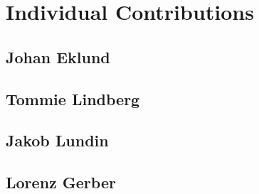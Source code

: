 \documentclass[a4paper,11pt,twoside]{article}
\begin{document}
\section{Individual Contributions}
\subsection{Johan Eklund}
\subsection{Tommie Lindberg}
\subsection{Jakob Lundin}
\subsection{Lorenz Gerber}


\end{document}
